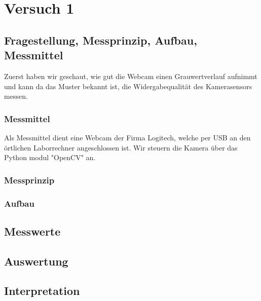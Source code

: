 \documentclass[TGAI_Laborbericht.tex]{subfiles}
\begin{document}
\chapter{Versuch 1}
\label{chap:VERSUCH_1}


\section{Fragestellung, Messprinzip, Aufbau, Messmittel}
\label{chap:VERSUCH_1_FRAGESTELLUNG}
Zuerst haben wir geschaut, wie gut die Webcam einen Grauwertverlauf aufnimmt und kann da das Muster bekannt ist, die Widergabequalität des Kamerasensors messen. 

\subsection{Messmittel}

Als Messmittel dient eine Webcam der Firma Logitech, welche per USB an den örtlichen Laborrechner angeschlossen ist. Wir steuern die Kamera über das Python modul "OpenCV" an.

\subsection{Messprinzip}

\subsection{Aufbau}


\section{Messwerte}
\label{chap:VERSUCH_1_MESSWERTE}

\section{Auswertung}
\label{chap:VERSUCH_1_AUSWERTUNG}

\section{Interpretation}
\label{chap:VERSUCH_1_INTERPRETATION}
\end{document}
